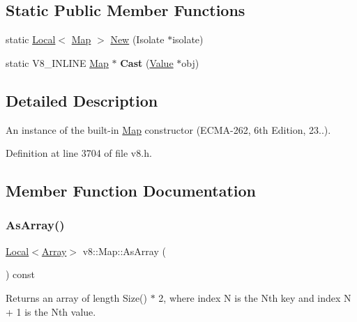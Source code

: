 \subsection*{Static Public Member Functions}
\begin{DoxyCompactItemize}
\item 
static \mbox{\hyperlink{classv8_1_1Local}{Local}}$<$ \mbox{\hyperlink{classv8_1_1Map}{Map}} $>$ \mbox{\hyperlink{classv8_1_1Map_afeefcbe3b73ae398051d4b5bbb3f075d}{New}} (Isolate $\ast$isolate)
\item 
\mbox{\label{classv8_1_1Map_ac53aafed02f275a7d3ce6da8cfd060c3}} 
static V8\+\_\+\+I\+N\+L\+I\+NE \mbox{\hyperlink{classv8_1_1Map}{Map}} $\ast$ {\bfseries Cast} (\mbox{\hyperlink{classv8_1_1Value}{Value}} $\ast$obj)
\end{DoxyCompactItemize}


\subsection{Detailed Description}
An instance of the built-\/in \mbox{\hyperlink{classv8_1_1Map}{Map}} constructor (E\+C\+M\+A-\/262, 6th Edition, 23..). 

Definition at line 3704 of file v8.\+h.



\subsection{Member Function Documentation}
\mbox{\label{classv8_1_1Map_a924483cc18fa2f287a43ca2d7eaef763}} 
\subsubsection{\texorpdfstring{As\+Array()}{AsArray()}}
{\footnotesize\ttfamily \mbox{\hyperlink{classv8_1_1Local}{Local}}$<$\mbox{\hyperlink{classv8_1_1Array}{Array}}$>$ v8\+::\+Map\+::\+As\+Array (\begin{DoxyParamCaption}{ }\end{DoxyParamCaption}) const}

Returns an array of length Size() $\ast$ 2, where index N is the Nth key and index N + 1 is the Nth value. \mbox{\label{classv8_1_1Map_afeefcbe3b73ae398051d4b5bbb3f075d}} 
